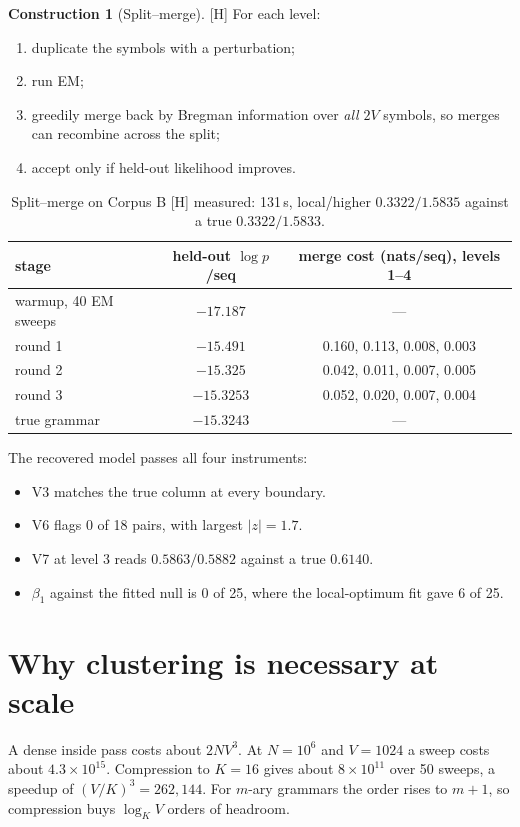 \documentclass[11pt]{article}
\theoremstyle{definition}
\newtheorem{construction}[theorem]{Construction}
\theoremstyle{remark}
\newcommand{\src}[1]{\textsf{\small[#1]}}
\newcommand{\st}[1]{\textsf{\small\color{gray}#1}}
\begin{document}
\begin{construction}[Split--merge]\src{H}
For each level:
\begin{enumerate}
  \item duplicate the symbols with a perturbation;
  \item run EM;
  \item greedily merge back by Bregman information over \emph{all} $2V$ symbols, so merges can recombine across the split;
  \item accept only if held-out likelihood improves.
\end{enumerate}
\end{construction}
\begin{table}[h]\centering\small
\begin{tabular}{lcc}
\toprule
stage & held-out $\log p$/seq & merge cost (nats/seq), levels 1--4\\
\midrule
warmup, 40 EM sweeps & $-17.187$ & ---\\
round 1 & $-15.491$ & 0.160, 0.113, 0.008, 0.003\\
round 2 & $-15.325$ & 0.042, 0.011, 0.007, 0.005\\
round 3 & $-15.3253$ & 0.052, 0.020, 0.007, 0.004\\
true grammar & $\mathbf{-15.3243}$ & ---\\
\bottomrule
\end{tabular}
\caption{Split--merge on Corpus B \src{H} \st{measured}: 131\,s, local/higher $0.3322/1.5835$ against a true $0.3322/1.5833$.}
\end{table}

The recovered model passes all four instruments:
\begin{itemize}
  \item V3 matches the true column at every boundary.
  \item V6 flags 0 of 18 pairs, with largest $|z|=1.7$.
  \item V7 at level 3 reads $0.5863/0.5882$ against a true $0.6140$.
  \item $\beta_1$ against the fitted null is 0 of 25, where the local-optimum fit gave 6 of 25.
\end{itemize}

\section{Why clustering is necessary at scale}
A dense inside pass costs about $2NV^3$. At $N=10^6$ and $V=1024$ a sweep costs about $4.3\times10^{15}$. Compression to $K=16$ gives about $8\times10^{11}$ over 50 sweeps, a speedup of $(V/K)^3=262{,}144$. For $m$-ary grammars the order rises to $m+1$, so compression buys $\log_KV$ orders of headroom.
\end{document}
